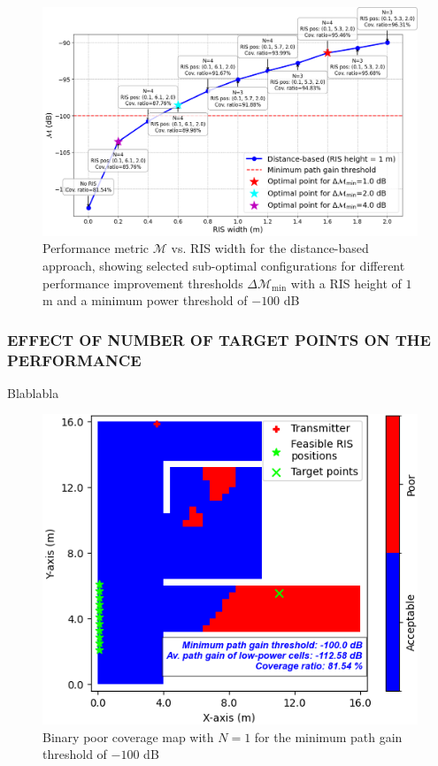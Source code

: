 \documentclass{IEEEoj}
\begin{document}
\begin{figure}
	\centering
	\includegraphics[width=\linewidth]{Sim_Results/perf_metric_RIS_width_-100dB_distance_height_1m.png}
	\caption{Performance metric $\mathcal{M}$ vs. RIS width for the distance-based approach, showing selected sub-optimal configurations for different performance improvement thresholds $\Delta \mathcal{M}_{\text{min}}$ with a RIS height of $1$ m and a minimum power threshold of $-100$ dB}
	\label{perf_metric_RIS_width_-100dB_distance_height_1m}
\end{figure}

\subsubsection{EFFECT OF NUMBER OF TARGET POINTS ON THE PERFORMANCE}
Blablabla

\begin{figure}
	\centering \includegraphics[width=.7\linewidth]{Sim_Results/Binary_Cov_Map_N_1_-100dB.png}
	\caption{Binary poor coverage map with $N = 1$ for the minimum path gain threshold of $-100$ dB}
	\label{binary_poor_cov_map_N_1}
\end{figure}
\end{document}
